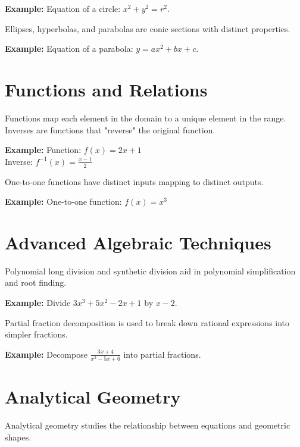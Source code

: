 \documentclass{article}
\begin{document}
\begin{framed}
\textbf{Example:}
Equation of a circle: \(x^2 + y^2 = r^2\).
\end{framed}

Ellipses, hyperbolas, and parabolas are conic sections with distinct properties.

\begin{framed}
\textbf{Example:}
Equation of a parabola: \(y = ax^2 + bx + c\).
\end{framed}

\section{Functions and Relations}
Functions map each element in the domain to a unique element in the range. Inverses are functions that "reverse" the original function.

\begin{framed}
\textbf{Example:}
Function: \(f(x) = 2x + 1\) \\
Inverse: \(f^{-1}(x) = \frac{x - 1}{2}\)
\end{framed}

One-to-one functions have distinct inputs mapping to distinct outputs.

\begin{framed}
\textbf{Example:}
One-to-one function: \(f(x) = x^3\)
\end{framed}

\section{Advanced Algebraic Techniques}
Polynomial long division and synthetic division aid in polynomial simplification and root finding.

\begin{framed}
\textbf{Example:}
Divide \(3x^3 + 5x^2 - 2x + 1\) by \(x - 2\).
\end{framed}

Partial fraction decomposition is used to break down rational expressions into simpler fractions.

\begin{framed}
\textbf{Example:}
Decompose \(\frac{3x + 4}{x^2 - 5x + 6}\) into partial fractions.
\end{framed}

\section{Analytical Geometry}
Analytical geometry studies the relationship between equations and geometric shapes.
\end{document}
